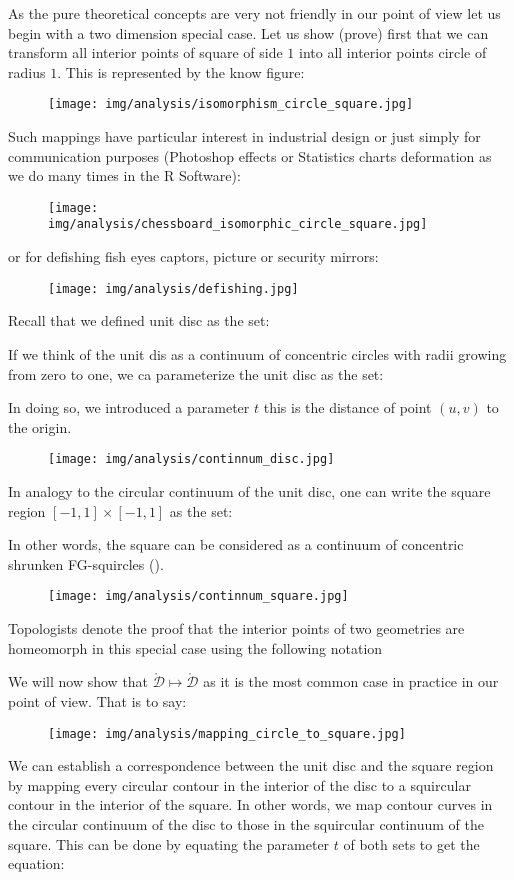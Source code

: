 	As the pure theoretical concepts are very not friendly in our point of view let us begin with a two dimension special case. Let us show (prove) first that we can transform all interior points of  square of side $1$ into all interior points circle of radius $1$. This is represented by the  know figure:
	\begin{figure}[H]
		\centering
		\texttt{[image: img/analysis/isomorphism\_circle\_square.jpg]}
	\end{figure}
	Such mappings have particular interest in industrial design or just simply for communication purposes (Photoshop effects or Statistics charts deformation as we do many times in the R Software):
	\begin{figure}[H]
		\centering
		\texttt{[image: img/analysis/chessboard\_isomorphic\_circle\_square.jpg]}
	\end{figure}
	or for defishing fish eyes captors, picture or security mirrors:
	\begin{figure}[H]
		\centering
		\texttt{[image: img/analysis/defishing.jpg]}
	\end{figure}
	Recall that we defined unit disc as the set:
	
	If we think of the unit dis as a continuum of concentric circles with radii growing from zero to one, we ca parameterize the unit disc as the set:
	
	In doing so, we introduced a parameter $t$ this is the distance of point $(u,v)$ to the origin.
	\begin{figure}[H]
		\centering
		\texttt{[image: img/analysis/continnum\_disc.jpg]}
	\end{figure}
	In analogy to the circular continuum of the unit disc, one can write the square region $[-1,1] \times [-1,1]$ as the set:
	
	In other words, the square can be considered as a continuum of concentric shrunken FG-squircles ().
	\begin{figure}[H]
		\centering
		\texttt{[image: img/analysis/continnum\_square.jpg]}
	\end{figure}

	Topologists denote the proof that the interior points of two geometries are homeomorph in this special case using the following notation
	
	We will now show that $\mathring{\mathcal{D}}\mapsto \mathring{\mathcal{D}}$ as it is the most common case in practice in our point of view. That is to say:
	\begin{figure}[H]
		\centering
		\texttt{[image: img/analysis/mapping\_circle\_to\_square.jpg]}
	\end{figure}
	We can establish a correspondence between the unit disc and the square region by mapping every circular contour in the interior of the disc to a squircular contour in the interior of the square. In other words, we map contour curves in the circular continuum of the disc to those in the squircular continuum of the square. This can be done by equating the parameter $t$ of both sets to get the equation:
	
